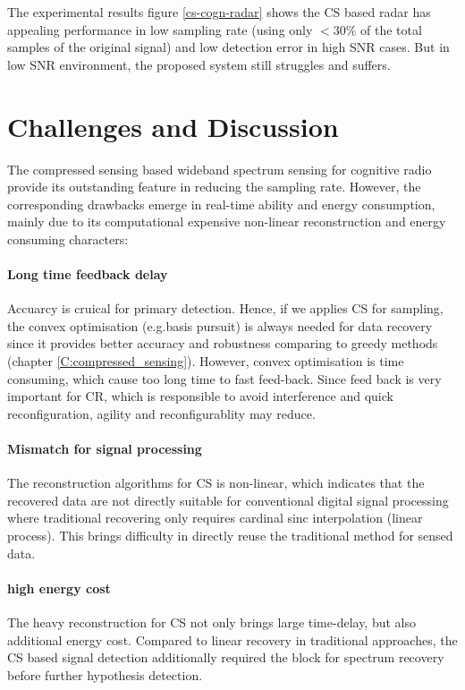 The experimental results figure \ref{cs-cogn-radar} shows the CS based radar has appealing performance in low sampling rate (using only $ < 30\%$ of the total samples of the original signal) and low detection error in high SNR cases. But in low SNR environment, the proposed system still struggles and suffers. 

\section{Challenges and Discussion}

\indent \indent The compressed sensing based wideband spectrum sensing for cognitive radio provide its outstanding feature in reducing the sampling rate. However, the corresponding drawbacks emerge in real-time ability and energy consumption, mainly due to its computational expensive non-linear reconstruction and energy consuming characters: 

\paragraph{Long time feedback delay}
Accuarcy is cruical for primary detection. Hence, if we applies CS for sampling, the convex optimisation (e.g.basis pursuit) is always needed for data recovery since it provides better accuracy and robustness comparing to greedy methods (chapter \ref{C:compressed_sensing}). However, convex optimisation is time consuming, which cause too long time to fast feed-back. Since feed back is very important for CR, which is responsible to avoid interference and quick reconfiguration, agility and reconfigurablity may reduce.

\paragraph{Mismatch for signal processing}
The reconstruction algorithms for CS is non-linear, which indicates that the recovered data are not directly suitable for conventional digital signal processing where traditional recovering only requires cardinal sinc interpolation (linear process). This brings difficulty in directly reuse the traditional method for sensed data.

\paragraph{high energy cost}
The heavy reconstruction for CS not only brings large time-delay, but also additional energy cost. Compared to linear recovery in traditional approaches, the CS based signal detection additionally required the block for spectrum recovery before further hypothesis detection. 

